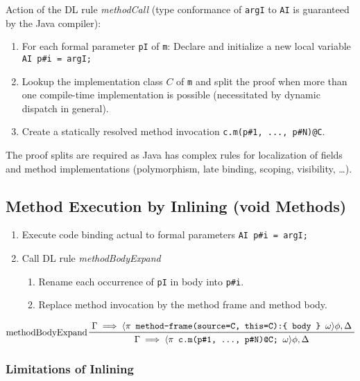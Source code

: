 		Action of the DL rule \textit{methodCall} (type conformance of \texttt{argI} to \texttt{AI} is guaranteed by the Java compiler):
		\begin{enumerate}
			\item For each formal parameter \texttt{pI} of \texttt{m}: Declare and initialize a new local variable \texttt{AI p\#i = argI;}
			\item Lookup the implementation class \(C\) of \texttt{m} and split the proof when more than one compile-time implementation is possible (necessitated by dynamic dispatch in general).
			\item Create a statically resolved method invocation \texttt{c.m(p\#1, ..., p\#N)@C}.
		\end{enumerate}
		The proof splits are required as Java has complex rules for localization of fields and method implementations (polymorphism, late binding, scoping, visibility, \dots).
	
		\subsection{Method Execution by Inlining (void Methods)}
			\begin{enumerate}
				\item Execute code binding actual to formal parameters \texttt{AI p\#i = argI;}
				\item Call DL rule \textit{methodBodyExpand}
					\begin{enumerate}
						\item Rename each occurrence of \texttt{pI} in body into \texttt{p\#i}.
						\item Replace method invocation by the method frame and method body.
					\end{enumerate}
			\end{enumerate}
		
			\begin{equation*}
				\prftree[l]
					{methodBodyExpand}
					{\Gamma \implies \langle \pi \texttt{ method-frame(source=C, this=C):\{ body \} } \omega \rangle \phi, \Delta}
					{\Gamma \implies \langle \pi \texttt{ c.m(p\#1, ..., p\#N)@C; } \omega\rangle \phi, \Delta}
			\end{equation*}
			
			\subsubsection{Limitations of Inlining}
				\label{sec:methodContractMotivation}
			
